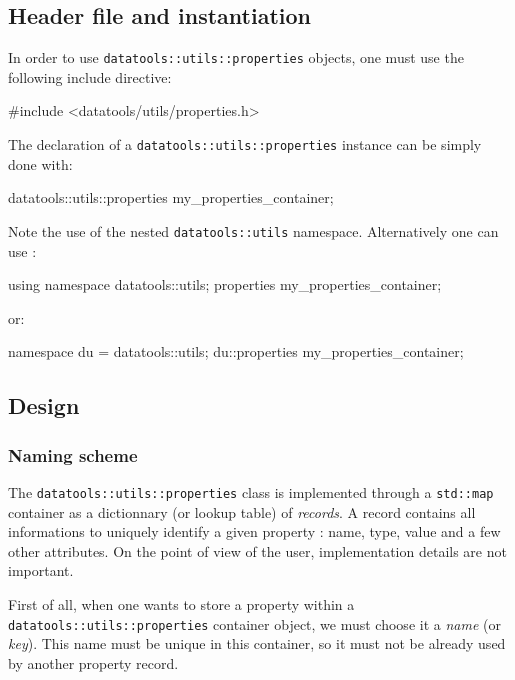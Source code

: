 \subsection{Header file and instantiation}

\pn In order to use \texttt{datatools::utils::properties} objects, one
must use the following include directive:
\begin{CppVerbatim} 
#include <datatools/utils/properties.h>
\end{CppVerbatim}

\pn The declaration of a  \texttt{datatools::utils::properties} instance
can be simply done with:
\begin{CppVerbatim} 
datatools::utils::properties my_properties_container;
\end{CppVerbatim}
\pn Note the use of the nested \texttt{datatools::utils} namespace.
Alternatively one can use :
\begin{CppVerbatim} 
using namespace datatools::utils;
properties my_properties_container;
\end{CppVerbatim}
\pn or:
\begin{CppVerbatim} 
namespace du = datatools::utils;
du::properties my_properties_container;
\end{CppVerbatim}

\subsection{Design}

\subsubsection{Naming scheme}

The \texttt{datatools::utils::properties} class is implemented through
a \texttt{std::map}  container as a  dictionnary (or lookup  table) of
\emph{records}.  A  record   contains  all  informations  to  uniquely
identify  a  given  property :  name,  type,  value  and a  few  other
attributes. On the  point of view of the  user, implementation details
are not important.

First  of  all,   when  one  wants  to  store   a  property  within  a
\texttt{datatools::utils::properties} container object, we must choose
it  a \emph{name}  (or \emph{key}).  This name  must be  unique  in this
container, so it must not be already used by another property record.

